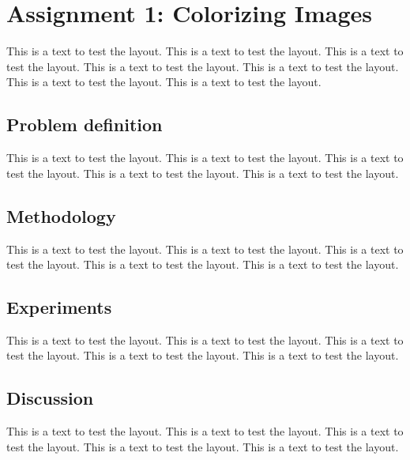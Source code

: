 \section{Assignment 1: Colorizing Images}
\label{sec:assignment1}

This is a text to test the layout. This is a text to test the layout.
This is a text to test the layout.  This is a text to test the layout.
This is a text to test the layout. This is a text to test the layout.
This is a text to test the layout.

\subsection{Problem definition}

This is a text to test the layout. This is a text to test the layout.
This is a text to test the layout. This is a text to test the layout.
This is a text to test the layout.

\subsection{Methodology}

This is a text to test the layout. This is a text to test the layout.
This is a text to test the layout. This is a text to test the layout.
This is a text to test the layout.

\subsection{Experiments}

This is a text to test the layout. This is a text to test the layout.
This is a text to test the layout. This is a text to test the layout.
This is a text to test the layout.

\subsection{Discussion}

This is a text to test the layout. This is a text to test the layout.
This is a text to test the layout. This is a text to test the layout.
This is a text to test the layout.

